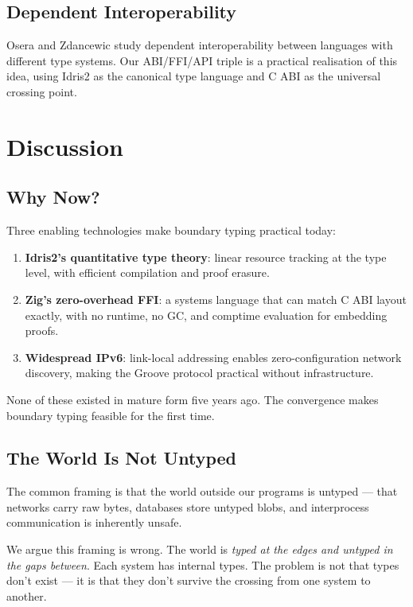 \documentclass[11pt,a4paper]{article}
\begin{document}
\subsection{Dependent Interoperability}
Osera and Zdancewic \cite{osera2012} study dependent interoperability
between languages with different type systems. Our ABI/FFI/API triple
is a practical realisation of this idea, using Idris2 as the canonical
type language and C ABI as the universal crossing point.

\section{Discussion}

\subsection{Why Now?}

Three enabling technologies make boundary typing practical today:

\begin{enumerate}
\item \textbf{Idris2's quantitative type theory}: linear resource
  tracking at the type level, with efficient compilation and proof
  erasure.
\item \textbf{Zig's zero-overhead FFI}: a systems language that
  can match C ABI layout exactly, with no runtime, no GC, and
  comptime evaluation for embedding proofs.
\item \textbf{Widespread IPv6}: link-local addressing enables
  zero-configuration network discovery, making the Groove protocol
  practical without infrastructure.
\end{enumerate}

None of these existed in mature form five years ago. The convergence
makes boundary typing feasible for the first time.

\subsection{The World Is Not Untyped}

The common framing is that the world outside our programs is untyped ---
that networks carry raw bytes, databases store untyped blobs, and
interprocess communication is inherently unsafe.

We argue this framing is wrong. The world is \emph{typed at the edges
and untyped in the gaps between}. Each system has internal types. The
problem is not that types don't exist --- it is that they don't survive
the crossing from one system to another.
\end{document}
